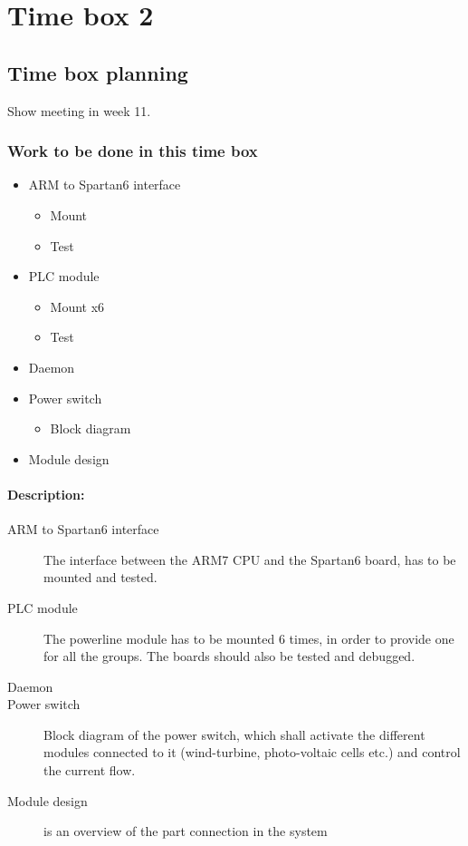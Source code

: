 \section{Time box 2}
\subsection{Time box planning}
Show meeting in week 11.
\subsubsection{Work to be done in this time box}
\begin{itemize}
	\item ARM to Spartan6 interface
	\begin{itemize}
		\item Mount
		\item Test
	\end{itemize}
	\item PLC module
	\begin{itemize}
		\item Mount x6
		\item Test
	\end{itemize}
	\item Daemon
	\item Power switch
	\begin{itemize}
		\item Block diagram
	\end{itemize}
	\item Module design
\end{itemize}
\paragraph{Description:}
\begin{description}
	\item[ARM to Spartan6 interface] The interface between the ARM7 CPU and the Spartan6 board, has to be mounted and tested. 
	\item[PLC module] The powerline module has to be mounted 6 times, in order to provide one for all the groups. The boards should also be tested and debugged.
	\item[Daemon] 
	\item[Power switch] Block diagram of the power switch, which shall activate the different modules connected to it (wind-turbine, photo-voltaic cells etc.) and control the current flow.
	\item[Module design] is an overview of the part connection in the system
\end{description}

